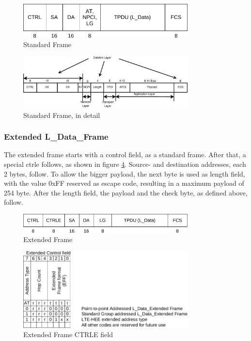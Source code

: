 \begin{figure}
    \centering
    \includegraphics[width=0.8\textwidth]{figures/standardframe}
    \caption{Standard Frame}
    \label{fig:stdframe}
\end{figure}

\begin{figure}
    \centering
    \includegraphics[width=0.8\textwidth]{figures/standardFrame.eps}
    \caption{Standard Frame, in detail}
    \label{fig:stdFrameDetail}
\end{figure}


\subsubsection{Extended L\_Data\_Frame}

The extended frame starts with a control field, as a standard frame. After that, a special \gls{ctrle} follows, as shown in figure \ref{fig:ctrle}.
Source- and destination addresses, each 2 bytes, follow. To allow the bigger payload, the next byte is used as length field, with the value 0xFF reserved
as escape code, resulting in a maximum payload of 254 byte. After the length field, the payload and the check byte, as defined above, follow.

\begin{figure}
    \centering
    \includegraphics[width=0.8\textwidth]{figures/extendedframe}
    \caption{Extended Frame}
    \label{fig:extframe}
\end{figure}

\begin{figure}
    \centering
    \includegraphics[width=0.8\textwidth]{figures/CTRLE}
    \caption{Extended Frame CTRLE field}
    \label{fig:ctrle}
\end{figure}

